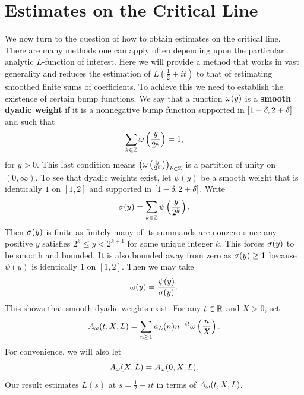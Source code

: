   \section{Estimates on the Critical Line}
    We now turn to the question of how to obtain estimates on the critical line. There are many methods one can apply often depending upon the particular analytic \(L\)-function of interest. Here we will provide a method that works in vast generality and reduces the estimation of \(L\left(\frac{1}{2}+it\right)\) to that of estimating smoothed finite sums of coefficients. To achieve this we need to establish the existence of certain bump functions. We say that a function \(\omega(y)\) is a \textbf{smooth dyadic weight} if it is a nonnegative bump function supported in \([1-\delta,2+\delta]\) and such that
    \[
      \sum_{k \in \mathbb{Z}}\omega\left(\frac{y}{2^{k}}\right) = 1,
    \]
    for \(y > 0\). This last condition means \(\left(\omega\left(\frac{y}{2^{k}}\right)\right)_{k \in \mathbb{Z}}\) is a partition of unity on \((0,\infty)\). To see that dyadic weights exist, let \(\psi(y)\) be a smooth weight that is identically \(1\) on \([1,2]\) and supported in \([1-\delta,2+\delta]\). Write
    \[
      \sigma(y) = \sum_{k \in \mathbb{Z}}\psi\left(\frac{y}{2^{k}}\right).
    \]
    Then \(\sigma(y)\) is finite as finitely many of its summands are nonzero since any positive \(y\) satisfies \(2^{k} \le y < 2^{k+1}\) for some unique integer \(k\). This forces \(\sigma(y)\) to be smooth and bounded. It is also bounded away from zero as \(\sigma(y) \ge 1\) because \(\psi(y)\) is identically \(1\) on \([1,2]\). Then we may take
    \[
      \omega(y) = \frac{\psi(y)}{\sigma(y)}.
    \]
    This shows that smooth dyadic weights exist. For any \(t \in \mathbb{R}\) and \(X > 0\), set
    \[
      A_{\omega}(t,X,L) = \sum_{n \ge 1}a_{L}(n)n^{-it}\omega\left(\frac{n}{X}\right).
    \]
    For convenience, we will also let
    \[
      A_{\omega}(X,L) = A_{\omega}(0,X,L).
    \]
    Our result estimates \(L(s)\) at \(s = \frac{1}{2}+it\) in terms of \(A_{\omega}(t,X,L)\).

